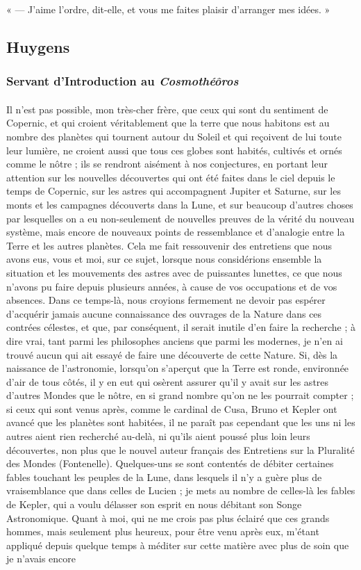 \documentclass[a4paper, 11pt, oneside]{article}
\begin{document}
« --- J'aime l'ordre, dit-elle, et vous me faites plaisir d'arranger mes idées. »
\clearpage
\subsection{Huygens}
\subsubsection{Servant d'Introduction au \emph{Cosmothéôros}}
\paragraph{}
Il n'est pas possible, mon très-cher frère, que ceux qui sont du sentiment de Copernic, et qui croient véritablement que la terre que nous habitons est au nombre des planètes qui tournent autour du Soleil et qui reçoivent de lui toute leur lumière, ne croient aussi que tous ces globes sont habités, cultivés et ornés comme le nôtre ; ils se rendront aisément à nos conjectures, en portant leur attention sur les nouvelles découvertes qui ont été faites dans le ciel depuis le temps de Copernic, sur les astres qui accompagnent Jupiter et Saturne, sur les monts et les campagnes découverts dans la Lune, et sur beaucoup d'autres choses par lesquelles on a eu non-seulement de nouvelles preuves de la vérité du nouveau système, mais encore de nouveaux points de ressemblance et d'analogie entre la Terre et les autres planètes. Cela me fait ressouvenir des entretiens que nous avons eus, vous et moi, sur ce sujet, lorsque nous considérions ensemble la situation et les mouvements des astres avec de puissantes lunettes, ce que nous n'avons pu faire depuis plusieurs années, à cause de vos occupations et de vos absences. Dans ce temps-là, nous croyions fermement ne devoir pas espérer d'acquérir jamais aucune connaissance des ouvrages de la Nature dans ces contrées célestes, et que, par conséquent, il serait inutile d'en faire la recherche ; à dire vrai, tant parmi les philosophes anciens que parmi les modernes, je n'en ai trouvé aucun qui ait essayé de faire une découverte de cette Nature. Si, dès la naissance de l'astronomie, lorsqu'on s'aperçut que la Terre est ronde, environnée d'air de tous côtés, il y en eut qui osèrent assurer qu'il y avait sur les astres d'autres Mondes que le nôtre, en si grand nombre qu'on ne les pourrait compter ; si ceux qui sont venus après, comme le cardinal de Cusa, Bruno et Kepler ont avancé que les planètes sont habitées, il ne paraît pas cependant que les uns ni les autres aient rien recherché au-delà, ni qu'ils aient poussé plus loin leurs découvertes, non plus que le nouvel auteur français des Entretiens sur la Pluralité des Mondes (Fontenelle). Quelques-uns se sont contentés de débiter certaines fables touchant les peuples de la Lune, dans lesquels il n'y a guère plus de vraisemblance que dans celles de Lucien ; je mets au nombre de celles-là les fables de Kepler, qui a voulu délasser son esprit en nous débitant son Songe Astronomique. Quant à moi, qui ne me crois pas plus éclairé que ces grands hommes, mais seulement plus heureux, pour être venu après eux, m'étant appliqué depuis quelque temps à méditer sur cette matière avec plus de soin que je n'avais encore 
\end{document}
